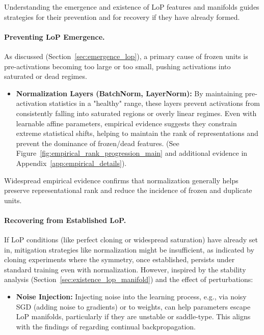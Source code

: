 \documentclass{article}
\begin{document}
Understanding the emergence and existence of LoP features and manifolds guides strategies for their prevention and for recovery if they have already formed.

\paragraph{Preventing LoP Emergence.}
As discussed (Section~\ref{sec:emergence_lop}), a primary cause of frozen units is pre-activations becoming too large or too small, pushing activations into saturated or dead regimes.
\begin{itemize}
    \item \textbf{Normalization Layers (BatchNorm, LayerNorm):} By maintaining pre-activation statistics in a "healthy" range, these layers prevent activations from consistently falling into saturated regions or overly linear regimes. Even with learnable affine parameters, empirical evidence suggests they constrain extreme statistical shifts, helping to maintain the rank of representations and prevent the dominance of frozen/dead features. (See Figure~\ref{fig:empirical_rank_progression_main} and additional evidence in Appendix~\ref{app:empirical_details}).
\end{itemize}
Widespread empirical evidence confirms that normalization generally helps preserve representational rank and reduce the incidence of frozen and duplicate units.

\paragraph{Recovering from Established LoP.}
If LoP conditions (like perfect cloning or widespread saturation) have already set in, mitigation strategies like normalization might be insufficient, as indicated by cloning experiments where the symmetry, once established, persists under standard training even with normalization.
However, inspired by the stability analysis (Section~\ref{sec:existence_lop_manifold}) and the effect of perturbations:
\begin{itemize}
    \item \textbf{Noise Injection:} Injecting noise into the learning process, e.g., via noisy SGD (adding noise to gradients) or to weights, can help parameters escape LoP manifolds, particularly if they are unstable or saddle-type. This aligns with the findings of \citet{dohare2024loss} regarding continual backpropagation.
\end{itemize}
\end{document}
